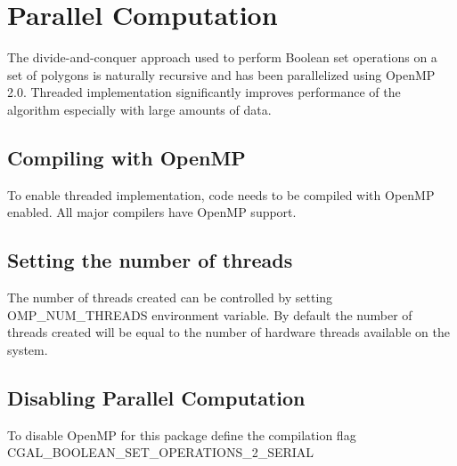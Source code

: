 \section{Parallel Computation\label{bso_sec:bso_par}}

\lcTex{%
  \setlength{\BooleanSetOpsWidthRight}{1.4cm}
  \setlength{\BooleanSetOpsWidthLeft}{\BooleanSetOpsWidthLineReal}
  \addtolength{\BooleanSetOpsWidthLeft}{-\BooleanSetOpsWidthRight}
  \begin{minipage}{\BooleanSetOpsWidthLeft}
}

The divide-and-conquer approach used to perform Boolean set operations on a set of polygons is naturally recursive and has been parallelized using OpenMP 2.0. Threaded implementation significantly improves performance of the algorithm especially with large amounts of data. 

\subsection{Compiling with OpenMP\label{bso_ssec:compiling_with_openmp}}

To enable threaded implementation, code needs to be compiled with OpenMP enabled. All major compilers have OpenMP support. 

\subsection{Setting the number of threads\label{bso_ssec:set_num_thread}}

The number of threads created can be controlled by setting OMP_NUM_THREADS environment variable. By default the number of threads created will be equal to the number of hardware threads available on the system.

\subsection{Disabling Parallel Computation\label{bso_ssec:disable_parallel}}

To disable OpenMP for this package define the compilation flag CGAL_BOOLEAN_SET_OPERATIONS_2_SERIAL

